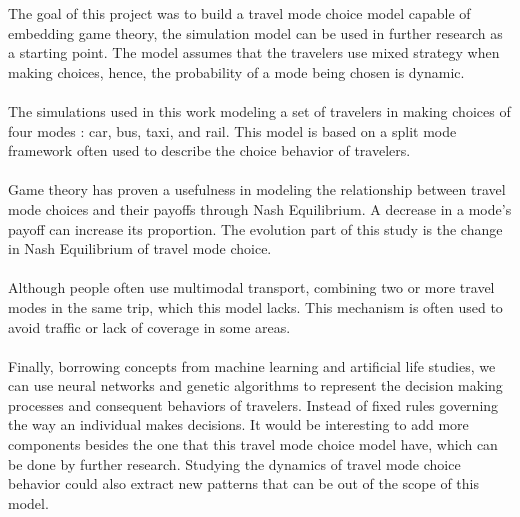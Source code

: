 The goal of this project was to build a travel mode choice model capable of embedding game theory, the simulation model can be used in further research as a starting point. The model assumes that the travelers use mixed strategy when making choices, hence, the probability of a mode being chosen is dynamic. \\

\paragraph{}
The simulations used in this work modeling a set of travelers in making choices of four modes : car, bus, taxi, and rail. This model is based on a split mode framework often used to describe the choice behavior of travelers.
\paragraph{}
Game theory has proven a usefulness in modeling the relationship between travel mode choices and their payoffs through Nash Equilibrium. A decrease in a mode's payoff can increase its proportion. The evolution part of this study is the change in Nash Equilibrium of travel mode choice.
\paragraph{}
Although people often use multimodal transport, combining two or more travel modes in the same trip, which this model lacks. This mechanism is often used to avoid traffic or lack of coverage in some areas.
\paragraph{}Finally, borrowing concepts from machine learning and artificial life studies, we can use neural networks and genetic algorithms to represent the decision making processes and consequent behaviors of travelers. Instead of fixed rules governing the way an individual makes decisions. It would be interesting to add more components besides the one that this travel mode choice model have, which can be done by further research. Studying the dynamics of travel mode choice behavior could also extract new patterns that can be out of the scope of this model.